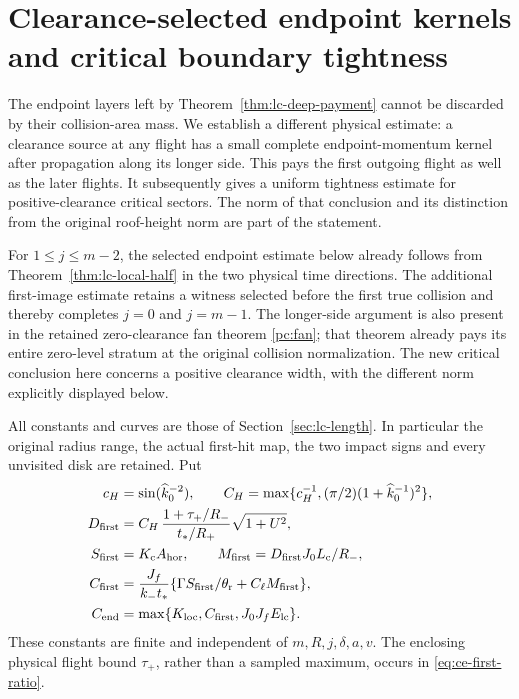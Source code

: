 \section{Clearance-selected endpoint kernels and critical boundary tightness}
\label{sec:ce-kernel}

The endpoint layers left by Theorem~\ref{thm:lc-deep-payment} cannot
be discarded by their collision-area mass.  We establish a different
physical estimate: a clearance source at any flight has a small
complete endpoint-momentum kernel after propagation along its longer
side.  This pays the first outgoing flight as well as the later
flights.  It subsequently gives a uniform tightness estimate for
positive-clearance critical sectors.  The norm of that conclusion
and its distinction from the original roof-height norm are part of
the statement.

For $1\le j\le m-2$, the selected endpoint estimate below
already follows from Theorem~\ref{thm:lc-local-half} in the two
physical time directions. The additional first-image estimate
retains a witness selected before the first true collision and
thereby completes $j=0$ and $j=m-1$. The longer-side argument is
also present in the retained zero-clearance fan theorem
\ref{pc:fan}; that theorem already pays its entire zero-level
stratum at the original collision normalization. The new critical
conclusion here concerns a positive clearance width, with the
different norm explicitly displayed below.

All constants and curves are those of Section~\ref{sec:lc-length}.
In particular the original radius range, the actual first-hit map,
the two impact signs and every unvisited disk are retained.  Put
\begin{align}
 c_H&=\sin(\widehat k_0^{-2}),\qquad
 C_H=\max\{c_H^{-1},(\pi/2)(1+\widehat k_0^{-1})^2\},\notag\\
 D_{\rm first}
   &=C_H\,\frac{1+\tau_+/R_-}{t_*/R_+}\sqrt{1+U^2},
                                                        \label{eq:ce-first-ratio}\\
 S_{\rm first}&=K_{\rm c}A_{\rm hor},\qquad
 M_{\rm first}=D_{\rm first}J_0L_{\rm c}/R_-,\notag\\
 C_{\rm first}
   &=\frac{J_f}{k_-t_*}
       \{\Gamma S_{\rm first}/\theta_{\rm r}
                                      +C_\ell M_{\rm first}\},\notag\\
 C_{\rm end}
   &=\max\{K_{\rm loc},C_{\rm first},J_0J_fE_{\rm lc}\}.
                                                        \label{eq:ce-constants}
\end{align}
These constants are finite and independent of $m,R,j,\delta,a,v$.
The enclosing physical flight bound $\tau_+$, rather than a sampled
maximum, occurs in \eqref{eq:ce-first-ratio}.

